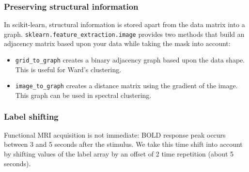 \documentclass{frontiersSCNS} %
\newcommand{\alex}[1]{\todo[inline, color=green!40]{#1}}
\begin{document}





\subsubsection{Preserving structural information}

In scikit-learn, structural information is stored apart from the data matrix
into a graph. \verb!sklearn.feature_extraction.image! provides two methods
that build an adjacency matrix based upon your data while taking the mask
into account:
\begin{itemize}
    \item \verb!grid_to_graph! creates a binary adjacency graph based upon the
        data shape. This is useful for Ward's clustering.
    \item \verb!image_to_graph! creates a distance matrix using the gradient of
        the image. This graph can be used in spectral clustering.
\end{itemize}

\subsubsection{Label shifting}

Functional MRI acquisition is not immediate: BOLD response peak occurs between 3
and 5 seconds after the stimulus. We take this time shift into account by
shifting values of the label array by an offset of 2 time repetition (about 5
seconds).

\end{document}
